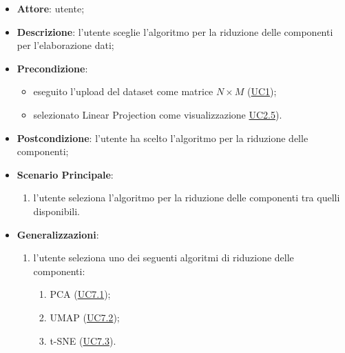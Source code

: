     \begin{itemize}
    \item \textbf{Attore}: utente;
    \item \textbf{Descrizione}: l'utente sceglie l'algoritmo per la riduzione delle componenti per l'elaborazione dati;
    \item \textbf{Precondizione}: 
    \begin{itemize}
        \item eseguito l'upload del dataset come matrice $N\times M$ (\hyperref[uc1]{UC1});
        \item selezionato Linear Projection come visualizzazione \hyperref[uc2.5]{UC2.5}).
    \end{itemize}  
    \item \textbf{Postcondizione}: l'utente ha scelto l'algoritmo per la riduzione delle componenti;
    \item \textbf{Scenario Principale}: 
    \begin{enumerate}
        \item l'utente seleziona l'algoritmo per la riduzione delle componenti tra quelli disponibili.
    \end{enumerate}
    \item \textbf{Generalizzazioni}:
        \begin{enumerate}
            \item l'utente seleziona uno dei seguenti algoritmi di riduzione delle componenti:
                \begin{enumerate}
                    \item PCA (\hyperref[uc7.1]{UC7.1});
                    \item UMAP (\hyperref[uc7.2]{UC7.2});
                    \item t-SNE (\hyperref[uc7.3]{UC7.3}).
                \end{enumerate}
        \end{enumerate}  
    \end{itemize}
    
